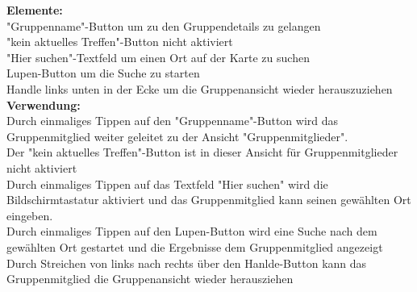 \textbf{Elemente:}\\
"Gruppenname"-Button um zu den Gruppendetails zu gelangen\\
"kein aktuelles Treffen"-Button nicht aktiviert\\
"Hier suchen"-Textfeld um einen Ort auf der Karte zu suchen\\
Lupen-Button um die Suche zu starten\\
Handle links unten in der Ecke um die Gruppenansicht wieder herauszuziehen\\
\textbf{Verwendung:}\\
Durch einmaliges Tippen auf den "Gruppenname"-Button wird das Gruppenmitglied weiter geleitet zu der Ansicht "Gruppenmitglieder".\\
Der "kein aktuelles Treffen"-Button ist in dieser Ansicht für Gruppenmitglieder nicht aktiviert\\
Durch einmaliges Tippen auf das Textfeld "Hier suchen" wird die Bildschirmtastatur aktiviert und das Gruppenmitglied kann seinen gewählten Ort eingeben.\\
Durch einmaliges Tippen auf den Lupen-Button wird eine Suche nach dem gewählten Ort gestartet und die Ergebnisse dem Gruppenmitglied angezeigt\\
Durch Streichen von links nach rechts über den Hanlde-Button kann das Gruppenmitglied die Gruppenansicht wieder herausziehen\\ \\


